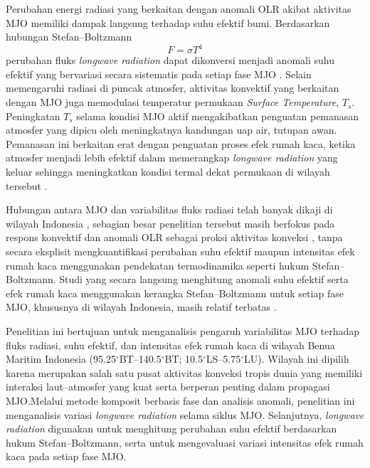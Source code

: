 \documentclass[12pt,a4paper]{report}
\begin{document}
Perubahan energi radiasi yang berkaitan dengan anomali OLR akibat aktivitas MJO memiliki dampak langsung terhadap suhu efektif bumi. Berdasarkan hubungan Stefan–Boltzmann \begin{equation}
F = \sigma T^4
\label{eq:stefan_boltzmann}
\end{equation}
perubahan fluks \textit{longwave radiation} dapat dikonversi menjadi anomali suhu efektif yang bervariasi secara sistematis pada setiap fase MJO \cite{Koll2018,Allan2014}.
Selain memengaruhi radiasi di puncak atmosfer, aktivitas konvektif yang berkaitan dengan MJO juga memodulasi temperatur permukaan \textit{Surface Temperature}, $T_s$. Peningkatan $T_s$ selama kondisi MJO aktif mengakibatkan penguatan pemanasan atmosfer yang dipicu oleh meningkatnya kandungan uap air, tutupan awan. Pemanasan ini berkaitan erat dengan penguatan proses efek rumah kaca, ketika atmosfer menjadi lebih efektif dalam memerangkap \textit{longwave radiation} yang keluar sehingga meningkatkan kondisi termal dekat permukaan di wilayah tersebut \cite{Trenberth2016,Wild2015}.

Hubungan antara MJO dan variabilitas fluks radiasi telah banyak dikaji di wilayah Indonesia \cite{sofiati2002, athoillah2017, batubara2022}, sebagian besar penelitian tersebut masih berfokus pada respons konvektif dan anomali OLR sebagai proksi aktivitas konveksi \cite{fajarianti2019, ramadhan2021, wahyuni2024}, tanpa secara eksplisit mengkuantifikasi perubahan suhu efektif maupun intensitas efek rumah kaca menggunakan pendekatan termodinamika seperti hukum Stefan–Boltzmann. Studi yang secara langsung menghitung anomali suhu efektif serta efek rumah kaca menggunakan kerangka Stefan–Boltzmann untuk setiap fase MJO, khususnya di wilayah Indonesia, masih relatif terbatas \cite{Ling2011}.

Penelitian ini bertujuan untuk menganalisis pengaruh variabilitas MJO terhadap fluks radiasi, suhu efektif, dan intensitas efek rumah kaca di wilayah Benua Maritim Indonesia (95.25$^\circ$BT--140.5$^\circ$BT; 10.5$^\circ$LS--5.75$^\circ$LU). Wilayah ini dipilih karena merupakan salah satu pusat aktivitas konveksi tropis dunia yang memiliki interaksi laut--atmosfer yang kuat serta berperan penting dalam propagasi MJO.Melalui metode komposit berbasis fase dan analisis anomali, penelitian ini menganalisis variasi \textit{longwave radiation} selama siklus MJO. Selanjutnya, \textit{longwave radiation} digunakan untuk menghitung perubahan suhu efektif berdasarkan hukum Stefan--Boltzmann, serta untuk mengevaluasi variasi intensitas efek rumah kaca pada setiap fase MJO.
\end{document}
